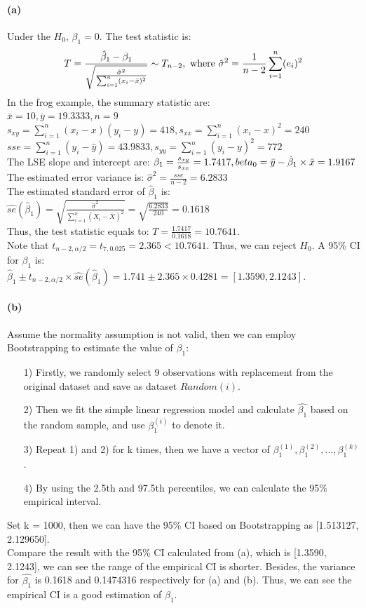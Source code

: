 \documentclass{article}
\begin{document}
\paragraph{(a)}
Under the $H_0$, $\beta_1=0$. The test statistic is: 
$$T=\frac{\hat{\beta}_1-\beta_1}{\sqrt{\frac{\hat{\sigma}^2}{\sum_{i=1}^{n}(x_i-\bar{x})^2}}}\sim T_{n-2},
\ \textup{where} \ \hat{\sigma}^2=\frac{1}{n-2}\sum_{i=1}^{n}(e_i)^2$$
In the frog example, the summary statistic are:\\
$\bar{x}=10,\bar{y}=19.3333,n=9$\\
$s_{xy}=\sum_{i=1}^{n}(x_i-x)(y_i-y)=418,s_{xx}=\sum_{i=1}^{n}(x_i-x)^2=240$\\
$sse=\sum_{i=1}^{n}(y_i-\hat{y})=43.9833,s_{yy}=\sum_{i=1}^{n}(y_i-y)^2=772$\\
The LSE slope and intercept are: $\beta_1=\frac{s_{xy}}{s_{xx}}=1.7417,\\beta_0=\bar{y}-\hat{\beta}_1\times \bar{x}=1.9167$\\
The estimated error variance is: $\hat{\sigma}^2=\frac{sse}{n-2}=6.2833$\\
The estimated standard error of $\hat{\beta}_1$ is: $\hat{se}(\hat{\beta}_1)=\sqrt{\frac{\hat{\sigma}^2}{\sum_{i=1}^{n}(X_i-\bar{X})^2}}=\sqrt{\frac{6.2833}{240}}=0.1618$\\
Thus, the test statistic equals to: $T=\frac{1.7417}{0.1618}=10.7641.$\\
Note that $t_{n-2,\alpha/2}=t_{7,0.025}=2.365<10.7641$. Thus, we can reject $H_0$. A 95\% CI for $\beta_1$ is:
\\ $\hat{\beta}_1\pm t_{n-2,\alpha/2}\times \hat{se}(\hat{\beta}_1)= 1.741 \pm 2.365 \times 0.4281 =[1.3590,2.1243]$.
\paragraph{(b)}
Assume the normality assumption is not valid, then we can employ Bootstrapping to estimate the value of $\beta_1$:
 \begin{itemize}
	\item[1)]
	Firstly, we randomly select 9 observations with replacement from the original dataset and save as dataset $Random(i)$.
	\item[2)]
	Then we fit the simple linear regression model and calculate $\hat{\beta_1}$ based on the random sample, and use $\beta_1^{(i)}$ to denote it.
	\item[3)]
	Repeat 1) and 2) for k times, then we have a vector of $\beta_1^{(1)}, \beta_1^{(2)},...,\beta_1^{(k)}$.
	\item[4)]
	By using the 2.5th and 97.5th percentiles, we can calculate the 95\% empirical interval.
\end{itemize}
Set k = 1000, then we can have the 95\% CI based on Bootstrapping as [1.513127, 2.129650].\\
Compare the result with the 95\% CI calculated from (a), which is [1.3590, 2.1243], we can see the range of the empirical CI is shorter. Besides, the variance for $\hat{\beta_1}$ is 0.1618 and 0.1474316 respectively for (a) and (b). Thus, we can see the empirical CI is a good estimation of $\beta_1$.
\end{document}

